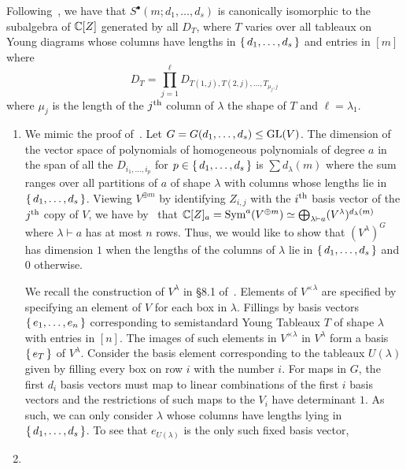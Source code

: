 \documentclass[letterpaper, 11pt, oneside]{book}
\begin{document}
\begin{sol}\label{ex:YT_9.1.4}
  Following~\cite[Corollary of Theorem 1, \S 8.1]{book:YT}, we have that $S^{\bullet}(m; d_{1}, \ldots, d_{s})$ is canonically isomorphic to the subalgebra of $\mathbb{C}[Z]$ generated by all $D_{T}$, where $T$ varies over all tableaux on Young diagrams whose columns have lengths in $\set{d_{1}, \ldots, d_{s}}$ and entries in $[m]$ where
  \[
    D_{T} = \prod_{j = 1}^{\ell} D_{T(1, j), T(2, j), \ldots, T_{\mu_{j}, j}}
  \]
  where $\mu_{j}$ is the length of the $j\textsuperscript{th}$ column of $\lambda$ the shape of $T$ and $\ell = \lambda_{1}$.
  \begin{enumerate}[label=(\alph*)]
    \item We mimic the proof of~\cite[Proposition 2, \S 9.1]{book:YT}.
          Let $G = G(d_{1}, \ldots, d_{s}) \leq \operatorname{GL}(V)$.
          The dimension of the vector space of polynomials of homogeneous polynomials of degree $a$ in the span of all the $D_{i_{1}, \ldots, i_{p}}$ for $p \in \set{d_{1}, \ldots, d_{s}}$ is $\sum d_{\lambda}(m)$ where the sum ranges over all partitions of $a$ of shape $\lambda$ with columns whose lengths lie in $\set{d_{1}, \ldots, d_{s}}$.
          Viewing $V^{\oplus m}$ by identifying $Z_{i, j}$ with the $i\textsuperscript{th}$ basis vector of the $j\textsuperscript{th}$ copy of $V$, we have by~\cite[Corollary 3(a), \S 8.3]{book:YT} that $\mathbb{C}[Z]_{a} = \operatorname{Sym}^{a}(V^{\oplus m}) \simeq \bigoplus_{\lambda \vdash a} (V^{\lambda})^{d_{\lambda}(m)}$ where $\lambda \vdash a$ has at most $n$ rows.
          Thus, we would like to show that $(V^{\lambda})^{G}$ has dimension $1$ when the lengths of the columns of $\lambda$ lie in $\set{d_{1}, \ldots, d_{s}}$ and $0$ otherwise.

          We recall the construction of $V^{\lambda}$ in \S 8.1 of~\cite{book:YT}.
          Elements of $V^{\times \lambda}$ are specified by specifying an element of $V$ for each box in $\lambda$.
          Fillings by basis vectors $\set{e_{1}, \ldots, e_{n}}$ corresponding to semistandard Young Tableaux $T$ of shape $\lambda$ with entries in $[n]$.
          The images of such elements in $V^{\times \lambda}$ in $V^{\lambda}$ form a basis $\set{e_{T}}$ of $V^{\lambda}$.
          Consider the basis element corresponding to the tableaux $U(\lambda)$ given by filling every box on row $i$ with the number $i$.
          For maps in $G$, the first $d_{i}$ basis vectors must map to linear combinations of the first $i$ basis vectors and the restrictions of such maps to the $V_{i}$ have determinant $1$.
          As such, we can only consider $\lambda$ whose columns have lengths lying in $\set{d_{1}, \ldots, d_{s}}$.
          To see that $e_{U(\lambda)}$ is the only such fixed basis vector,
    \item
  \end{enumerate}
\end{sol}
\end{document}
